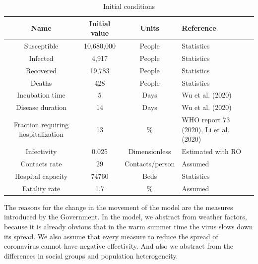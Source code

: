 \documentclass[12pt,a4paper,english]{article}
\begin{document}
    \begin{table}[h!]
        \centering
        \begin{tabularx}{\textwidth}{|c|c|c|X|}
            \hline
            Name & Initial value & Units & Reference \\
            \hline
            Susceptible	                        & 10,680,000 &	People & Statistics \\
            Infected                            & 4,917 &	People & Statistics \\
            Recovered                           & 19,783 &	People & Statistics \\
            Deaths                              & 428 &	People & Statistics \\
            Incubation time	                    & 5	 &  Days & Wu et al. (2020)\\
            Disease duration                    & 14	&  Days & Wu et al. (2020)\\
            Fraction requiring hospitalization	& 13  & \% & WHO report 73 (2020), Li et al. (2020) \\
            Infectivity	                        & 0.025 & Dimensionless & Estimated with RO \\
            Contacts rate	                    & 29   & Contacts/person & Assumed \\
            Hospital capacity	                & 74760 & Beds & Statistics \\
            Fatality rate	                    & 1.7	   & \% & Assumed \\
            \hline
        \end{tabularx}
        \caption{Initial conditions}
        \label{tab:init_vars2}
    \end{table}
    
    The reasons for the change in the movement of the model are the measures introduced by the Government. In the model, we abstract
    from weather factors, because it is already obvious that in the warm summer time the virus slows down its spread.
    We also assume that every measure to reduce the spread of coronavirus cannot have negative effectivity. And also we abstract from the differences in social groups and population heterogeneity.
    
\end{document}
